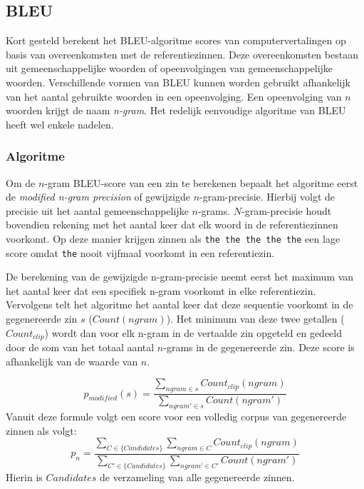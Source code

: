 \subsection{BLEU}
Kort gesteld berekent het BLEU-algoritme scores van computervertalingen op basis van overeenkomsten met de referentiezinnen. Deze overeenkomsten bestaan uit gemeenschappelijke woorden of opeenvolgingen van gemeenschappelijke woorden. Verschillende vormen van BLEU kunnen worden gebruikt afhankelijk van het aantal gebruikte woorden in een opeenvolging. Een opeenvolging van $n$ woorden krijgt de naam \emph{n-gram}. Het redelijk eenvoudige algoritme van BLEU heeft wel enkele nadelen.

\subsubsection{Algoritme}
Om de $n$-gram BLEU-score van een zin te berekenen bepaalt het algoritme eerst de \textit{modified n-gram precision} of gewijzigde $n$-gram-precisie. Hierbij volgt de precisie uit het aantal gemeenschappelijke $n$-grams. $N$-gram-precisie houdt bovendien rekening met het aantal keer dat elk woord in de referentiezinnen voorkomt. Op deze manier krijgen zinnen als \texttt{the the the the the} een lage score omdat \texttt{the} nooit vijfmaal voorkomt in een referentiezin. 

De berekening van de gewijzigde n-gram-precisie neemt eerst het maximum van het aantal keer dat een specifiek n-gram voorkomt in elke referentiezin. Vervolgens telt het algoritme het aantal keer dat deze sequentie voorkomt in de gegenereerde zin $s$ ($Count(ngram)$). Het minimum van deze twee getallen ($Count_ {clip}$) wordt dan voor elk n-gram in de vertaalde zin opgeteld en gedeeld door de som van het totaal aantal $n$-grams in de gegenereerde zin. Deze score is afhankelijk van de waarde van $n$.

\begin{equation}
p_{modified}(s) =
\frac{\sum\limits_{ngram \in s} Count_{clip}(ngram)}{\sum\limits_{ngram' \in s} Count(ngram')}
\label{formule:ngramprecision}
\end{equation}
Vanuit deze formule volgt een score voor een volledig corpus van gegenereerde zinnen als volgt:
\begin{equation}
p_{n} =
\frac{\sum\limits_{C \in \{Candidates\} } \sum\limits_{ngram \in C} Count_{clip}(ngram)}{\sum\limits_{C' \in \{Candidates\} } \sum\limits_{ngram' \in C'} Count(ngram')}
\label{formule:corpus_modified}
\end{equation}
Hierin is $Candidates$ de verzameling van alle gegenereerde zinnen.

